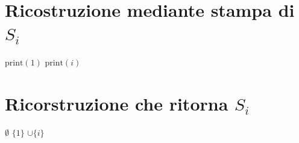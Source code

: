 \newpage
\section{Ricostruzione mediante stampa di $S_i$}
\begin{algorithm}[H]
\caption{\textsc{Print-HV}$(i, c)$}
\begin{algorithmic}[1]
    \State \Return
{}
    \State $\text{print}(1)$
    \State {} 
\Else
    \State {} 
    \State $\text{print}(i)$
\EndIf
\end{algorithmic}
\end{algorithm}


\section{Ricorstruzione che ritorna $S_i$}
\begin{algorithm}[H]
\caption{\textsc{Set-HV}$(i, c)$}
\begin{algorithmic}[1]
    \State \Return $\emptyset$
    \State \Return $\{1\}$
    \State \Return {}
\Else
    \State \Return {} $\cup \{i\}$
\EndIf
\end{algorithmic}
\end{algorithm}
